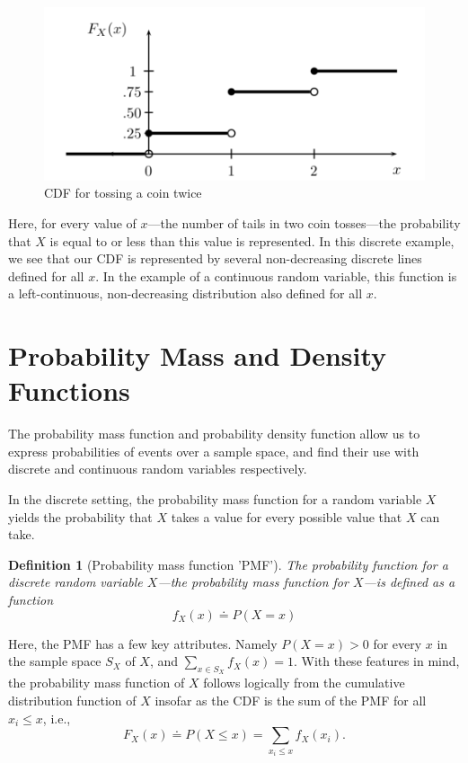 \documentclass[
  12pt,
]{book}
\theoremstyle{definition}
\newtheorem{definition}{Definition}[chapter]
\theoremstyle{definition}
\theoremstyle{definition}
\theoremstyle{remark}
\begin{document}
\begin{figure}

{\centering \includegraphics[width=0.7\linewidth]{./images/cdf} 

}

\caption{CDF for tossing a coin twice \citep{Wasserman2004}}\label{fig:cdfimg}
\end{figure}

Here, for every value of \(x\)---the number of tails in two coin tosses---the probability that \(X\) is equal to or less than this value is represented.
In this discrete example, we see that our CDF is represented by several non-decreasing discrete lines defined for all \(x\).
In the example of a continuous random variable, this function is a left-continuous, non-decreasing distribution also defined for all \(x\).

\hypertarget{probability-mass-and-density-functions}{%
\section{Probability Mass and Density Functions}\label{probability-mass-and-density-functions}}

The probability mass function and probability density function allow us to express probabilities of events over a sample space, and find their use with discrete and continuous random variables respectively.

In the discrete setting, the probability mass function for a random variable \(X\) yields the probability that \(X\) takes a value for every possible value that \(X\) can take.

\begin{definition}[Probability mass function 'PMF']
\protect\hypertarget{def:pmf}{}{\label{def:pmf} {} }\emph{The probability function for a discrete random variable \(X\)---the probability mass function for \(X\)---is defined as a function}
\[f_{X}(x) \doteq P(X=x)\]
\end{definition}

Here, the PMF has a few key attributes.
Namely \(P(X=x)>0\) for every \(x\) in the sample space \(S_{X}\) of \(X\), and \(\sum_{x \in S_{X}}f_{X}(x)=1\).
With these features in mind, the probability mass function of \(X\) follows logically from the cumulative distribution function of \(X\) insofar as the CDF is the sum of the PMF for all \(x_{i}≤x\), i.e., \[F_{X}(x) \doteq P(X≤x)=\sum_{x_i≤x}f_{X}(x_{i}).\]
\end{document}
